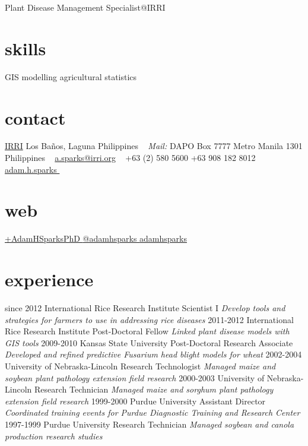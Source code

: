 \documentclass[]{friggeri-cv}
\begin{document}
       {Plant Disease Management Specialist@IRRI}


\begin{aside}
\section{skills}
\small{GIS
modelling
agricultural statistics
~
\section{contact}
\href{http://www.irri.org/}{IRRI}
Los Ba\~nos, Laguna
Philippines
~
\emph{Mail:}
DAPO Box 7777
Metro Manila
1301 Philippines
~
\href{mailto:a.sparks@irri.org}{a.sparks@irri.org}
~
+63 (2) 580 5600 \faPhone
+63 908 182 8012  \faMobilePhone
{\href{skype:adam.h.sparks?call}{adam.h.sparks }}
~
\section{web}
\href{http://plus.google.com/+AdamHSparksPhD}{+AdamHSparksPhD {\color{google.plus}\faGooglePlusSign}}
\href{https://www.twitter.com/adamhsparks/}{@adamhsparks {\color{twitter.blue}\faTwitter}}
\href{https://github.com/adamhsparks/}{adamhsparks \faGithub}}
\end{aside}

\section{experience}
\begin{entrylist}
  \entry
    {since 2012}
    {International Rice Research Institute }
    {Scientist I}
    {\emph{Develop tools and strategies for farmers to use in addressing rice diseases}}
  \entry
    {2011-2012}
    {International Rice Research Institute }
    {Post-Doctoral Fellow}
    {\emph{Linked plant disease models with GIS tools}}
  \entry
    {2009-2010}
    {Kansas State University}
    {Post-Doctoral Research Associate}
    {\emph{Developed and refined predictive Fusarium head blight models for wheat}}
  \entry
   {2002-2004}
   {University of Nebraska-Lincoln}
   {Research Technologist}
   {\emph{Managed maize and soybean plant pathology extension field research}}
  \entry
   {2000-2003}
   {University of Nebraska-Lincoln}
   {Research Technician}
   {\emph{Managed maize and sorghum plant pathology extension field research}}
  \entry
   {1999-2000}
   {Purdue University}
   {Assistant Director}
   {\emph{Coordinated training events for Purdue Diagnostic Training and Research Center}}
  \entry
   {1997-1999}
   {Purdue University}
   {Research Technician}
   {\emph{Managed soybean and canola production research studies}}
\end{entrylist}
\end{document}
